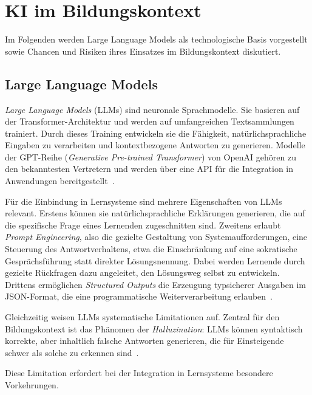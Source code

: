 
\section{KI im Bildungskontext}\label{sec:ki-bildung}

Im Folgenden werden Large Language Models als technologische Basis vorgestellt sowie Chancen und Risiken ihres Einsatzes im Bildungskontext diskutiert.

\subsection{Large Language Models}\label{subsec:llm}

\textit{Large Language Models} (LLMs) sind neuronale Sprachmodelle. Sie basieren auf der Trans\-former-Architektur und werden auf umfangreichen Textsammlungen trainiert.
Durch dieses Training entwickeln sie die Fähigkeit, natürlichsprachliche Eingaben zu verarbeiten und kontextbezogene Antworten zu generieren. Modelle der GPT-Reihe (\textit{Generative Pre-trained Transformer}) von OpenAI gehören zu den bekanntesten Vertretern und werden über eine API für die Integration in Anwendungen bereitgestellt~\cite{openai_api}.

Für die Einbindung in Lernsysteme sind mehrere Eigenschaften von LLMs relevant. 
Erstens können sie natürlichsprachliche Erklärungen generieren, die auf die spezifische Frage eines Lernenden zugeschnitten sind. 
Zweitens erlaubt \textit{Prompt Engineering}, also die gezielte Gestaltung von Systemaufforderungen, eine Steuerung des Antwortverhaltens, etwa die Einschränkung auf eine sokratische Gesprächsführung statt direkter Lösungsnennung. Dabei werden Lernende durch gezielte Rückfragen dazu angeleitet, den Lösungsweg selbst zu entwickeln. 
Drittens ermöglichen \textit{Structured Outputs} die Erzeugung typsicherer Ausgaben im JSON-Format, die eine programmatische Weiterverarbeitung erlauben~\cite{openai_structured_outputs}.

Gleichzeitig weisen LLMs systematische Limitationen auf. Zentral für den Bildungskontext ist das Phänomen der \textit{Halluzination}: LLMs können syntaktisch korrekte, aber inhaltlich falsche Antworten generieren, die für Einsteigende schwer als solche zu erkennen sind~\cite{kasneci2023}. 

Diese Limitation erfordert bei der Integration in Lernsysteme besondere Vorkehrungen.


